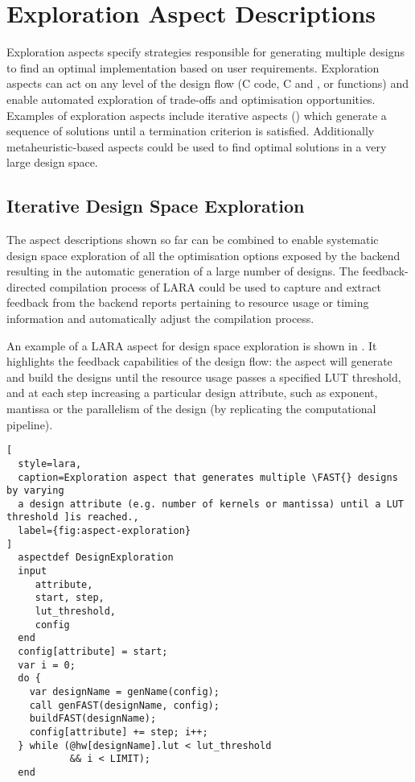 \section{Exploration Aspect Descriptions}

Exploration aspects specify strategies responsible for generating
multiple designs to find an optimal implementation based on user
requirements. Exploration aspects can act on any level of the design
flow (C code, C and \FAST{}, or \FAST{} functions) and enable
automated exploration of trade-offs and optimisation
opportunities. Examples of exploration aspects include iterative
aspects () which generate a sequence of solutions
until a termination criterion is satisfied. Additionally
metaheuristic-based aspects could be used to find optimal solutions in
a very large design space.

\subsection{Iterative Design Space Exploration}
\label{sect:asp_it}
The aspect descriptions shown so far can be combined to enable
systematic design space exploration of all the optimisation options
exposed by the \FAST{} backend resulting in the automatic generation
of a large number of designs. The feedback-directed compilation
process of LARA could be used to capture and extract feedback from the
backend reports pertaining to resource usage or timing information and
automatically adjust the compilation process.

An example of a LARA aspect for design space exploration is shown in
. It highlights the feedback capabilities
of the design flow: the aspect will generate and build the \FAST{}
designs until the resource usage passes a specified LUT threshold, and
at each step increasing a particular design attribute, such as
exponent, mantissa or the parallelism of the design (by replicating
the computational pipeline).

\begin{lstlisting}[
  style=lara,
  caption=Exploration aspect that generates multiple \FAST{} designs by varying
  a design attribute (e.g. number of kernels or mantissa) until a LUT threshold ]is reached.,
  label={fig:aspect-exploration}
]
  aspectdef DesignExploration
  input
     attribute,
     start, step,
     lut_threshold,
     config
  end
  config[attribute] = start;
  var i = 0;
  do {
    var designName = genName(config);
    call genFAST(designName, config);
    buildFAST(designName);
    config[attribute] += step; i++;
  } while (@hw[designName].lut < lut_threshold
           && i < LIMIT);
  end
\end{lstlisting}

